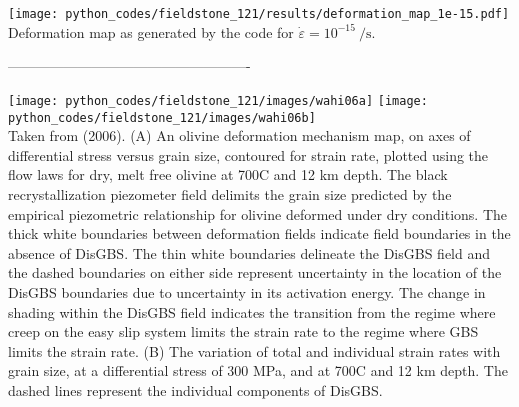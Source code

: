 \begin{center}
\texttt{[image: python\_codes/fieldstone\_121/results/deformation\_map\_1e-15.pdf]}\\
{\captionfont Deformation map as generated by the code for $\dot\varepsilon=10^{-15}~\si{\per\second}$.}
\end{center}

----------------------------------------------------

\begin{center}
\texttt{[image: python\_codes/fieldstone\_121/images/wahi06a]}
\texttt{[image: python\_codes/fieldstone\_121/images/wahi06b]}\\
{\captionfont Taken from \textcite{wahi06} (2006).
(A) An olivine deformation mechanism map, on axes of
differential stress versus grain size, contoured for strain rate, plotted
using the flow laws for dry, melt free olivine at 700C and 12 km
depth. The black recrystallization piezometer field delimits
the grain size predicted by the empirical piezometric relationship for
olivine deformed under dry conditions. The thick white
boundaries between deformation fields indicate field boundaries in the
absence of DisGBS. The thin white boundaries delineate the DisGBS
field and the dashed boundaries on either side represent uncertainty in
the location of the DisGBS boundaries due to uncertainty in its
activation energy. The change in shading within the DisGBS field
indicates the transition from the regime where creep on the easy slip
system limits the strain rate to the regime where GBS limits the strain
rate. (B) The variation of total and individual strain rates with grain
size, at a differential stress of 300 MPa, and at 700C and 12 km depth.
The dashed lines represent the individual components of DisGBS.} 
\end{center}



